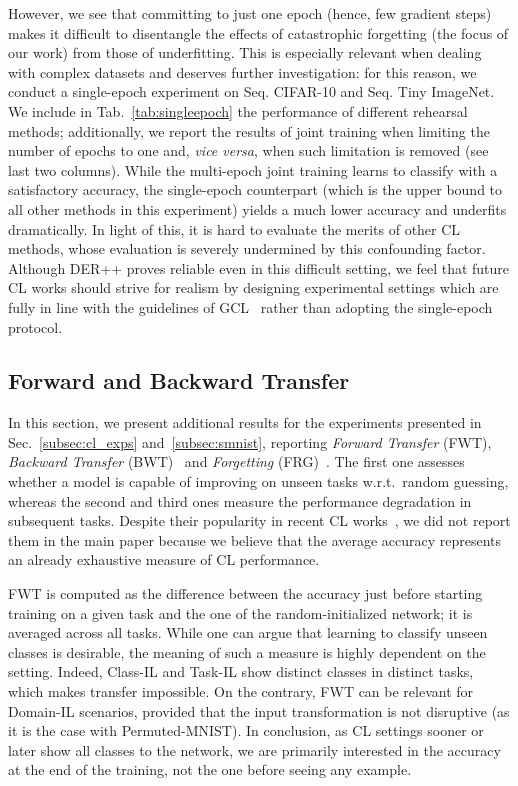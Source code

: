 \documentclass{article}
\begin{document}
However, we see that committing to just one epoch (hence, few gradient steps) makes it difficult to disentangle the effects of catastrophic forgetting (the focus of our work) from those of underfitting. This is especially relevant when dealing with complex datasets and deserves further investigation: for this reason, we conduct a single-epoch experiment on Seq. CIFAR-10 and Seq. Tiny ImageNet. We include in Tab.~\ref{tab:singleepoch} the performance of different rehearsal methods; additionally, we report the results of joint training when limiting the number of epochs to one and, \textit{vice versa}, when such limitation is removed (see last two columns). While the multi-epoch joint training learns to classify with a satisfactory accuracy, the single-epoch counterpart (which is the upper bound to all other methods in this experiment) yields a much lower accuracy and underfits dramatically. In light of this, it is hard to evaluate the merits of other CL methods, whose evaluation is severely undermined by this confounding factor. Although DER++ proves reliable even in this difficult setting, we feel that future CL works should strive for realism by designing experimental settings which are fully in line with the guidelines of GCL~\cite{de2019continual} rather than adopting the single-epoch protocol.

\subsection{Forward and Backward Transfer}
\label{subsec:fwbwt}

In this section, we present additional results for the experiments presented in Sec.~\ref{subsec:cl_exps} and~\ref{subsec:smnist}, reporting \textit{Forward Transfer} (FWT), \textit{Backward Transfer} (BWT)~\cite{lopez2017gradient} and \textit{Forgetting} (FRG)~\cite{chaudhry2018riemannian}. The first one assesses whether a model is capable of improving on unseen tasks w.r.t.\ random guessing, whereas the second and third ones measure the performance degradation in subsequent tasks. Despite their popularity in recent CL works~\cite{chaudhry2018riemannian, chaudhry2020using, de2019continual,lopez2017gradient}, we did not report them in the main paper because we believe that the average accuracy represents an already exhaustive measure of CL performance.

FWT is computed as the difference between the accuracy just before starting training on a given task and the one of the random-initialized network; it is averaged across all tasks. While one can argue that learning to classify unseen classes is desirable, the meaning of such a measure is highly dependent on the setting. Indeed, Class-IL and Task-IL show distinct classes in distinct tasks, which makes transfer impossible. On the contrary, FWT can be relevant for Domain-IL scenarios, provided that the input transformation is not disruptive (as it is the case with Permuted-MNIST). In conclusion, as CL settings sooner or later show all classes to the network, we are primarily interested in the accuracy at the end of the training, not the one before seeing any example.
\end{document}
